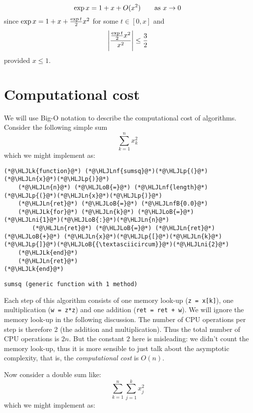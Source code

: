 \begin{example}
\[
\exp x = 1 + x + O(x^2) \qquad \hbox{as $x \ensuremath{\rightarrow} 0$}
\]
since $\exp x = 1 + x + {\exp t \over 2} x^2$ for some $t \in [0,x]$ and
\[
\left|{{\exp t \over 2} x^2 \over x^2}\right| \leq {3 \over 2}
\]
provided $x \leq 1$. \end{example}

\section{Computational cost}
We will use Big-O notation to describe the computational cost of algorithms. Consider the following simple sum
\[
\sum_{k=1}^n x_k^2
\]
which we might implement as:


\begin{lstlisting}
(*@\HLJLk{function}@*) (*@\HLJLnf{sumsq}@*)(*@\HLJLp{(}@*)(*@\HLJLn{x}@*)(*@\HLJLp{)}@*)
    (*@\HLJLn{n}@*) (*@\HLJLoB{=}@*) (*@\HLJLnf{length}@*)(*@\HLJLp{(}@*)(*@\HLJLn{x}@*)(*@\HLJLp{)}@*)
    (*@\HLJLn{ret}@*) (*@\HLJLoB{=}@*) (*@\HLJLnfB{0.0}@*)
    (*@\HLJLk{for}@*) (*@\HLJLn{k}@*) (*@\HLJLoB{=}@*) (*@\HLJLni{1}@*)(*@\HLJLoB{:}@*)(*@\HLJLn{n}@*)
        (*@\HLJLn{ret}@*) (*@\HLJLoB{=}@*) (*@\HLJLn{ret}@*) (*@\HLJLoB{+}@*) (*@\HLJLn{x}@*)(*@\HLJLp{[}@*)(*@\HLJLn{k}@*)(*@\HLJLp{]}@*)(*@\HLJLoB{{\textasciicircum}}@*)(*@\HLJLni{2}@*)
    (*@\HLJLk{end}@*)
    (*@\HLJLn{ret}@*)
(*@\HLJLk{end}@*)
\end{lstlisting}

\begin{lstlisting}
sumsq (generic function with 1 method)
\end{lstlisting}


Each step of this algorithm consists of one memory look-up (\texttt{z = x[k]}), one multiplication (\texttt{w = z*z}) and one addition (\texttt{ret = ret + w}). We will ignore the memory look-up in the following discussion. The number of CPU operations per step is therefore 2 (the addition and multiplication). Thus the total number of CPU operations is $2n$. But the constant $2$ here is misleading: we didn't count the memory look-up, thus it is more sensible to just talk about the asymptotic complexity, that is, the \emph{computational cost} is $O(n)$.

Now consider a double sum like:
\[
\sum_{k=1}^n \sum_{j=1}^k x_j^2
\]
which we might implement as:


